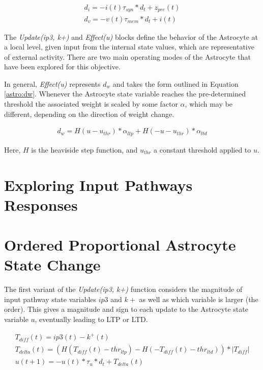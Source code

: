     \begin{align}
      d_{i} = -i(t) \tau_{syn} * d_t + z_{pre}(t) \label{eq:lif:i} \\
      d_{v} = -v(t) \tau_{mem} * d_t + i(t) \label{eq:lif:v}
    \end{align}

    The \emph{Update(ip3, k+)} and \emph{Effect(u)} blocks define the behavior
    of the Astrocyte at a local level, given input from the internal state
    values, which are representative of external activity. There are two main
    operating modes of the Astrocyte that have been explored for this objective.

    In general, \emph{Effect(u)} represents $d_w$ and takes the form outlined in
    Equation \ref{astro:dw}. Whenever the Astrocyte state variable reaches the
    pre-determined threshold the associated weight is scaled by some factor
    $\alpha$, which may be different, depending on the direction of weight
    change.

    \begin{align}
      d_w = H(u - u_{thr}) * \alpha_{ltp} + H(-u - u_{thr}) * \alpha_{ltd} \label{astro:dw}
    \end{align}

    Here, $H$ is the heaviside step function, and $u_{thr}$ a constant threshold
    applied to $u$.

    \section{Exploring Input Pathways Responses}

    \section{Ordered Proportional Astrocyte State Change}
    The first variant of the \emph{Update(ip3, k+)} function considers the
    magnitude of input pathway state variables $ip3$ and $k+$ as well as which
    variable is larger (the order). This gives a magnitude and sign to each
    update to the Astrocyte state variable $u$, eventually leading to LTP or
    LTD.

    \begin{align}
      T_{diff}(t) = ip3(t) - k^+(t) \\
      T_{delta}(t) = (H(T_{diff}(t) - thr_{ltp}) - H(-T_{diff}(t) - thr_{ltd})) * |T_{diff}| \\
      u(t+1) = -u(t) * \tau_{u} * d_t + T_{delta}(t) \label{eq:astro:rate-u}
    \end{align}

